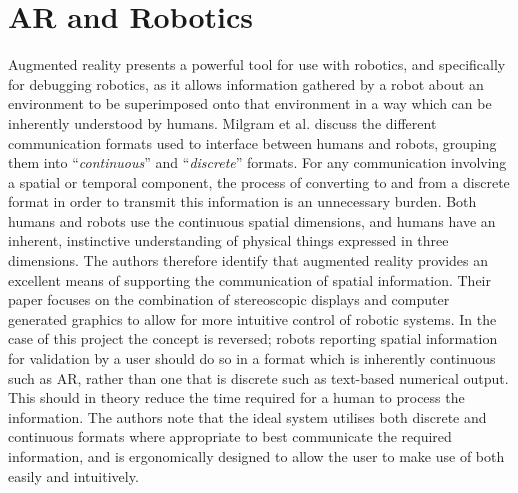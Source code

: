\section{AR and Robotics} \label{AugmentedReality}
Augmented reality presents a powerful tool for use with robotics, and specifically for debugging robotics, as it allows information gathered by a robot about an environment to be superimposed onto that environment in a way which can be inherently understood by humans. Milgram et al. \cite{Milgram:1993} discuss the different communication formats used to interface between humans and robots, grouping them into ``\textit{continuous}'' and ``\textit{discrete}'' formats. For any communication involving a spatial or temporal component, the process of converting to and from a discrete format in order to transmit this information is an unnecessary burden. Both humans and robots use the continuous spatial dimensions, and humans have an inherent, instinctive understanding of physical things expressed in three dimensions. The authors therefore identify that \cite{Milgram:1993} augmented reality provides an excellent means of supporting the communication of spatial information. Their paper focuses on the combination of stereoscopic displays and computer generated graphics to allow for more intuitive control of robotic systems. In the case of this project the concept is reversed; robots reporting spatial information for validation by a user should do so in a format which is inherently continuous such as AR, rather than one that is discrete such as text-based numerical output. This should in theory reduce the time required for a human to process the information. The authors note that \cite{Milgram:1993} the ideal system utilises both discrete and continuous formats where appropriate to best communicate the required information, and is ergonomically designed to allow the user to make use of both easily and intuitively.

